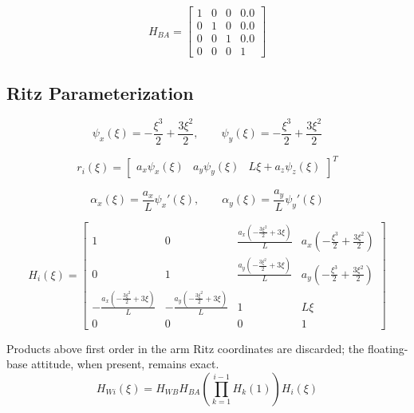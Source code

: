 \documentclass[11pt]{article}
\begin{document}
\begin{equation}
H_{BA}=\begin{bmatrix}1 & 0 & 0 & 0.0\\0 & 1 & 0 & 0.0\\0 & 0 & 1 & 0.0\\0 & 0 & 0 & 1\end{bmatrix}\label{eq:mount-transform}
\end{equation}

\subsection{Ritz Parameterization}
\begin{equation}
\psi_x(\xi)=- \frac{\xi^{3}}{2} + \frac{3 \xi^{2}}{2},\qquad\psi_y(\xi)=- \frac{\xi^{3}}{2} + \frac{3 \xi^{2}}{2}
\end{equation}

\begin{equation}
r_i(\xi)=\begin{bmatrix}a_x\psi_x(\xi)&a_y\psi_y(\xi)&L\xi+a_z\psi_z(\xi)\end{bmatrix}^T
\end{equation}

\begin{equation}
\alpha_x(\xi)=\frac{a_x}{L}\psi_x'(\xi),\qquad \alpha_y(\xi)=\frac{a_y}{L}\psi_y'(\xi)
\end{equation}

\begin{equation}
H_i(\xi)=\begin{bmatrix}1 & 0 & \frac{a_x \left(- \frac{3 \xi^{2}}{2} + 3 \xi\right)}{L} & a_x \left(- \frac{\xi^{3}}{2} + \frac{3 \xi^{2}}{2}\right)\\0 & 1 & \frac{a_y \left(- \frac{3 \xi^{2}}{2} + 3 \xi\right)}{L} & a_y \left(- \frac{\xi^{3}}{2} + \frac{3 \xi^{2}}{2}\right)\\- \frac{a_x \left(- \frac{3 \xi^{2}}{2} + 3 \xi\right)}{L} & - \frac{a_y \left(- \frac{3 \xi^{2}}{2} + 3 \xi\right)}{L} & 1 & L \xi\\0 & 0 & 0 & 1\end{bmatrix}\label{eq:local-transform}
\end{equation}

Products above first order in the arm Ritz coordinates are discarded; the floating-base attitude, when present, remains exact.
\begin{equation}
H_{Wi}(\xi)=H_{WB}H_{BA}\left(\prod_{k=1}^{i-1}H_k(1)\right)H_i(\xi)
\end{equation}
\end{document}
